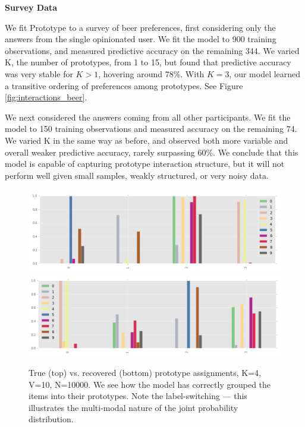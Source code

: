 \bigskip

\textbf{Survey Data}

\bigskip

We fit Prototype to a survey of beer preferences, first considering only the answers from the single opinionated user.
We fit the model to 900 training observations, and measured predictive accuracy on the remaining 344.
We varied K, the number of prototypes, from 1 to 15, but found that predictive accuracy was very stable for $K > 1$, hovering around 78\%.
With $K=3$, our model learned a transitive ordering of preferences among prototypes. See Figure \ref{fig:interactions_beer}.

We next considered the answers coming from all other participants.
We fit the model to 150 training observations and measured accuracy on the remaining 74.
We varied K in the same way as before, and observed both more variable and overall weaker predictive accuracy, rarely surpassing 60\%.
We conclude that this model is capable of capturing prototype interaction structure, but it will not perform well given small samples, weakly structured, or very noisy data.


\begin{figure}
\includegraphics[width=\textwidth]{images/pi}
\includegraphics[width=\textwidth]{images/gamma}
\caption{True (top) vs. recovered (bottom) prototype assignments, K=4, V=10, N=10000. We see how the model has correctly grouped the items into their prototypes. Note the label-switching --- this illustrates the multi-modal nature of the joint probability distribution.}
\label{fig:pi_v_gamma} 
\end{figure}


